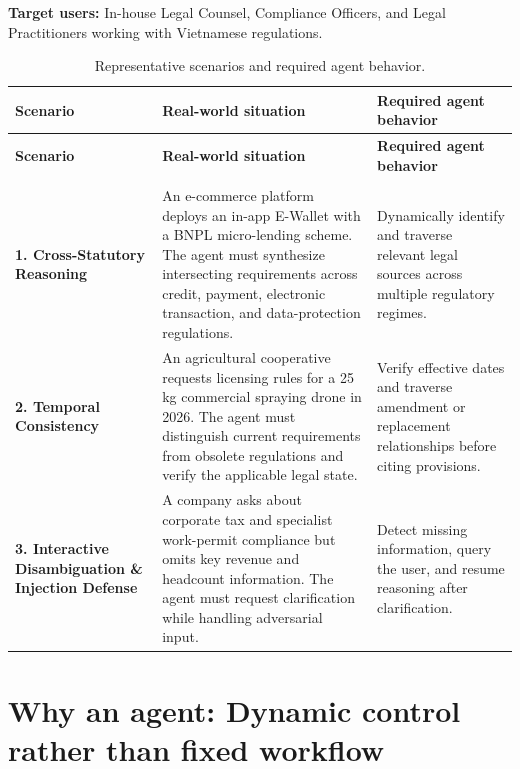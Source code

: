 \documentclass[10pt,a4paper]{article}
\begin{document}
\textbf{Target users:} In-house Legal Counsel, Compliance Officers, and Legal Practitioners working with Vietnamese regulations.

\begingroup
\small
\begin{longtable}{>{\raggedright\arraybackslash}p{} >{\raggedright\arraybackslash}p{} >{\raggedright\arraybackslash}p{}}
\caption{Representative scenarios and required agent behavior.}
\label{tab:user-scenarios} \\
\toprule
\textbf{Scenario} & \textbf{Real-world situation} & \textbf{Required agent behavior} \\
\midrule
\endfirsthead
\toprule
\textbf{Scenario} & \textbf{Real-world situation} & \textbf{Required agent behavior} \\
\midrule
\endhead
\midrule
\multicolumn{3}{r}{\small\itshape Continued on next page} \\
\endfoot
\bottomrule
\endlastfoot

\textbf{1. Cross-Statutory Reasoning}
&
An e-commerce platform deploys an in-app E-Wallet with a BNPL micro-lending scheme. The agent must synthesize intersecting requirements across credit, payment, electronic transaction, and data-protection regulations.
&
Dynamically identify and traverse relevant legal sources across multiple regulatory regimes. \\ \addlinespace

\textbf{2. Temporal Consistency}
&
An agricultural cooperative requests licensing rules for a 25 kg commercial spraying drone in 2026. The agent must distinguish current requirements from obsolete regulations and verify the applicable legal state.
&
Verify effective dates and traverse amendment or replacement relationships before citing provisions. \\ \addlinespace

\textbf{3. Interactive Disambiguation \& Injection Defense}
&
A company asks about corporate tax and specialist work-permit compliance but omits key revenue and headcount information. The agent must request clarification while handling adversarial input.
&
Detect missing information, query the user, and resume reasoning after clarification. \\
\end{longtable}
\endgroup

\section{Why an agent: Dynamic control rather than fixed workflow}
\end{document}
